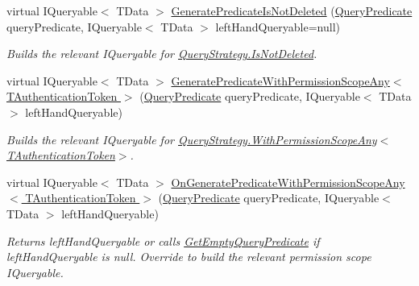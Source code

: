 \begin{DoxyCompactItemize}
virtual I\+Queryable$<$ T\+Data $>$ \hyperlink{classCqrs_1_1Repositories_1_1Queries_1_1QueryBuilder_a9a6596d3dd0e4489bfa2d5d93ac93ec8_a9a6596d3dd0e4489bfa2d5d93ac93ec8}{Generate\+Predicate\+Is\+Not\+Deleted} (\hyperlink{classCqrs_1_1Repositories_1_1Queries_1_1QueryPredicate}{Query\+Predicate} query\+Predicate, I\+Queryable$<$ T\+Data $>$ left\+Hand\+Queryable=null)
\begin{DoxyCompactList}\small\item\em Builds the relevant I\+Queryable for \hyperlink{classCqrs_1_1Repositories_1_1Queries_1_1QueryStrategy_aa872cafb9c17c9ea9d933be2ba209a6b_aa872cafb9c17c9ea9d933be2ba209a6b}{Query\+Strategy.\+Is\+Not\+Deleted}. \end{DoxyCompactList}\item 
virtual I\+Queryable$<$ T\+Data $>$ \hyperlink{classCqrs_1_1Repositories_1_1Queries_1_1QueryBuilder_a7768a63fd46f991f87a00b51484c2f34_a7768a63fd46f991f87a00b51484c2f34}{Generate\+Predicate\+With\+Permission\+Scope\+Any$<$ T\+Authentication\+Token $>$} (\hyperlink{classCqrs_1_1Repositories_1_1Queries_1_1QueryPredicate}{Query\+Predicate} query\+Predicate, I\+Queryable$<$ T\+Data $>$ left\+Hand\+Queryable)
\begin{DoxyCompactList}\small\item\em Builds the relevant I\+Queryable for \hyperlink{classCqrs_1_1Repositories_1_1Queries_1_1QueryStrategy_a7fda4380a88972201258bf695ccaf287_a7fda4380a88972201258bf695ccaf287}{Query\+Strategy.\+With\+Permission\+Scope\+Any$<$\+T\+Authentication\+Token$>$}. \end{DoxyCompactList}\item 
virtual I\+Queryable$<$ T\+Data $>$ \hyperlink{classCqrs_1_1Repositories_1_1Queries_1_1QueryBuilder_aee213115d002518b78463c7bc5fb5c52_aee213115d002518b78463c7bc5fb5c52}{On\+Generate\+Predicate\+With\+Permission\+Scope\+Any$<$ T\+Authentication\+Token $>$} (\hyperlink{classCqrs_1_1Repositories_1_1Queries_1_1QueryPredicate}{Query\+Predicate} query\+Predicate, I\+Queryable$<$ T\+Data $>$ left\+Hand\+Queryable)
\begin{DoxyCompactList}\small\item\em Returns {\itshape left\+Hand\+Queryable}  or calls \hyperlink{classCqrs_1_1Repositories_1_1Queries_1_1QueryBuilder_a7dc8f0da3bb4ef54b8cbdda6c50ee0a1_a7dc8f0da3bb4ef54b8cbdda6c50ee0a1}{Get\+Empty\+Query\+Predicate} if {\itshape left\+Hand\+Queryable}  is null. Override to build the relevant permission scope I\+Queryable. \end{DoxyCompactList}\item 

\end{DoxyCompactItemize}
